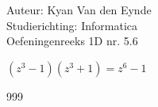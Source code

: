 \documentclass[a4paper]{article}
\begin{document}
  
\noindent \large Auteur: Kyan Van den Eynde \\
\noindent \large Studierichting: Informatica\\
\noindent \large Oefeningenreeks 1D nr. 5.6\\

\medskip

\normalsize

$(z^3-1)(z^3+1)=z^6-1$\\

\begin{thebibliography}{999}
\end{thebibliography}
\end{document}

